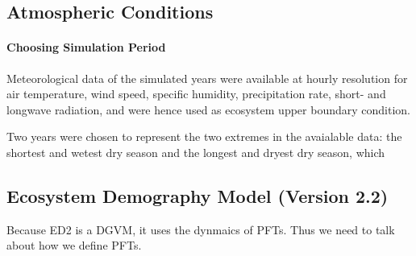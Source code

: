 \subsection*{Atmospheric Conditions}

\paragraph{Choosing Simulation Period}




 Meteorological data of the simulated years were available at hourly resolution for air temperature, wind speed, specific humidity, precipitation rate, short- and longwave radiation, and were hence used as ecosystem upper boundary condition. 
 
 Two years were chosen to represent the two extremes in the avaialable data: the shortest and wetest dry season and the longest and dryest dry season, which  
 

\subsection*{Ecosystem Demography Model (Version 2.2)}



Because ED2 is a DGVM, it uses the dynmaics of PFTs. Thus we need to talk about how we define PFTs. 

